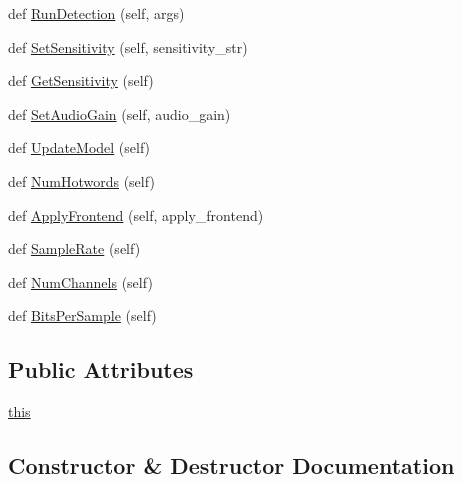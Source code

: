 \begin{DoxyCompactItemize}
\item 
def \hyperlink{classsnowboydetect_1_1SnowboyDetect_aa81c3446d9f86cdc82afe896b7503f92}{Run\+Detection} (self, args)
\item 
def \hyperlink{classsnowboydetect_1_1SnowboyDetect_a31672fe0859a72050c7e143c58c218c7}{Set\+Sensitivity} (self, sensitivity\+\_\+str)
\item 
def \hyperlink{classsnowboydetect_1_1SnowboyDetect_a836549077589837b8e94f563f3f9ff03}{Get\+Sensitivity} (self)
\item 
def \hyperlink{classsnowboydetect_1_1SnowboyDetect_acfa7c3d929aa0a1400a85f4c85883830}{Set\+Audio\+Gain} (self, audio\+\_\+gain)
\item 
def \hyperlink{classsnowboydetect_1_1SnowboyDetect_a5fe893dcbae408d4419b33b8f1c7db5a}{Update\+Model} (self)
\item 
def \hyperlink{classsnowboydetect_1_1SnowboyDetect_a281b6281e98d035872f289a4d31041dd}{Num\+Hotwords} (self)
\item 
def \hyperlink{classsnowboydetect_1_1SnowboyDetect_a4b4e6740fe532680390a8dcf3501a64a}{Apply\+Frontend} (self, apply\+\_\+frontend)
\item 
def \hyperlink{classsnowboydetect_1_1SnowboyDetect_aa4a6097517da1f8ba4fab8041e0748b8}{Sample\+Rate} (self)
\item 
def \hyperlink{classsnowboydetect_1_1SnowboyDetect_a46d9f2d6be050a727731557d7865ec96}{Num\+Channels} (self)
\item 
def \hyperlink{classsnowboydetect_1_1SnowboyDetect_a0281b47c8358e32c8aa464213b0dba97}{Bits\+Per\+Sample} (self)
\end{DoxyCompactItemize}
\subsection*{Public Attributes}
\begin{DoxyCompactItemize}
\item 
\hyperlink{classsnowboydetect_1_1SnowboyDetect_a1259775d218033e60489f0c00eac8eea}{this}
\end{DoxyCompactItemize}


\subsection{Constructor \& Destructor Documentation}
